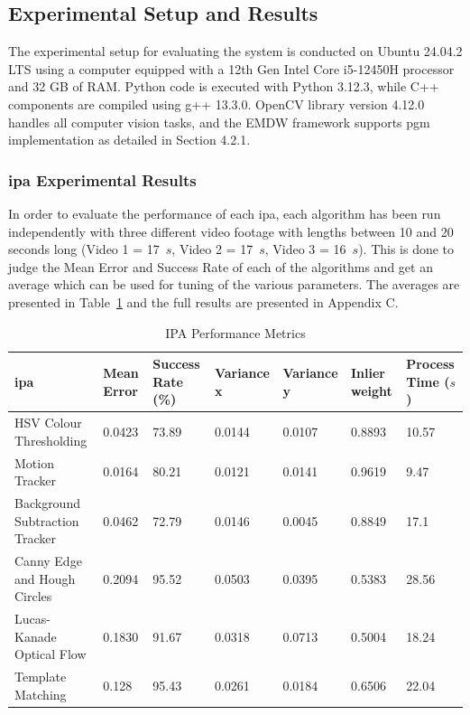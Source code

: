 \documentclass[12pt,a4paper]{article}
\begin{document}
\subsection{Experimental Setup and Results}
The experimental setup for evaluating the system is conducted on Ubuntu 24.04.2 LTS using a computer equipped with a 12th Gen Intel Core i5-12450H processor and 32 GB of RAM. Python code is executed with Python 3.12.3, while C++ components are compiled using g++ 13.3.0. OpenCV library version 4.12.0 handles all computer vision tasks, and the EMDW framework supports \acs{pgm} implementation as detailed in Section 4.2.1. 

\subsubsection{\acs{ipa} Experimental Results}
In order to evaluate the performance of each \acs{ipa}, each algorithm has been run independently with three different video footage with lengths between 10 and 20 seconds long (Video 1 = 17~$s$, Video 2 = 17~$s$, Video 3 = 16~$s$). This is done to judge the Mean Error and Success Rate of each of the algorithms and get an average which can be used for tuning of the various parameters. The averages are presented in Table~\ref{tab:ipaExp} and the full results are presented in Appendix C.

\begin{table}[H]
\centering
\caption{IPA Performance Metrics}
\label{tab:ipaExp}
\begin{tabular}{p{2cm} p{1.5cm} p{1.7cm} p{1.75cm} p{1.75cm} p{1.2cm} p{1.2cm}}
\toprule
\acs{ipa} & Mean Error & Success Rate (\%) & Variance x & Variance y & Inlier weight & Process Time ($s$)\\
\midrule
HSV Colour Thresholding & 0.0423 & 73.89 & 0.0144 & 0.0107 & 0.8893 & 10.57 \\
Motion Tracker & 0.0164 & 80.21 & 0.0121 & 0.0141 & 0.9619 & 9.47\\
Background Subtraction Tracker & 0.0462 & 72.79 & 0.0146 & 0.0045 & 0.8849 & 17.1\\
Canny Edge and Hough Circles & 0.2094 & 95.52 & 0.0503 & 0.0395 & 0.5383 & 28.56\\
Lucas-Kanade Optical Flow & 0.1830 & 91.67 & 0.0318 & 0.0713 & 0.5004 & 18.24\\
Template Matching & 0.128 & 95.43 & 0.0261 & 0.0184 & 0.6506 & 22.04\\
\bottomrule
\end{tabular}
\end{table}
\end{document}
